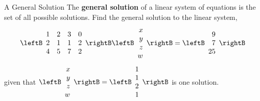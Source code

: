 \begin{example}{A General Solution}\label{exa:generalsolution}
The \textbf{general solution}  of a linear system of equations 
is the set of
all possible solutions. Find the general solution to the linear system,
\begin{equation*}
\leftB
\begin{array}{rrrr}
1 & 2 & 3 & 0 \\
2 & 1 & 1 & 2 \\
4 & 5 & 7 & 2
\end{array}
\rightB \leftB
\begin{array}{r}
x \\
y \\
z \\
w
\end{array}
\rightB =\leftB
\begin{array}{r}
9 \\
7 \\
25
\end{array}
\rightB
\end{equation*}
given that $\leftB
\begin{array}{r}
x \\
y \\
z \\
w
\end{array}
\rightB=\leftB
\begin{array}{r}
1 \\
1 \\
2 \\
1
\end{array}
\rightB$ is one solution.
\end{example}


